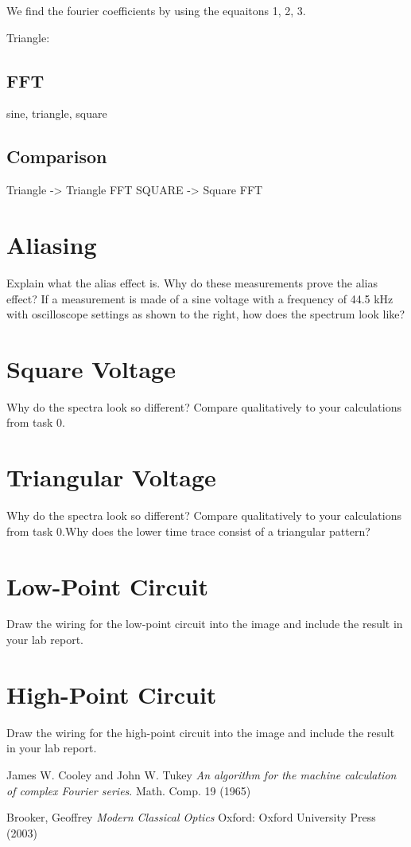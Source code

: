 \documentclass{article}
\begin{document}
We find the fourier coefficients by using the equaitons 1, 2, 3.

Triangle:

\subsection{FFT}
sine, triangle, square
\subsection{Comparison}
Triangle -> Triangle FFT
SQUARE -> Square FFT

\section{Aliasing}
Explain what the alias effect is. Why do these measurements prove the alias effect? If a measurement is made of a sine voltage with a frequency of 44.5 kHz with oscilloscope settings as shown to the right, how does the spectrum look like?



\section{Square Voltage}
Why do the spectra look so different? Compare qualitatively to your calculations from task 0.

\section{Triangular Voltage}
Why do the spectra look so different? Compare qualitatively to your calculations from task 0.Why does the lower time trace consist of a triangular pattern?
\section{Low-Point Circuit}
Draw the wiring for the low-point circuit into the image and include the result in your lab report.

\section{High-Point Circuit}
Draw the wiring for the high-point circuit into the image and include the result in your lab report.

\begin{thebibliography}{9}
James W. Cooley and John W. Tukey
\textit{An algorithm for the machine calculation of complex Fourier series}.
Math. Comp. 19 (1965)

Brooker, Geoffrey
\textit{Modern Classical Optics}
Oxford: Oxford University Press (2003)
\end{thebibliography}
\end{document}
